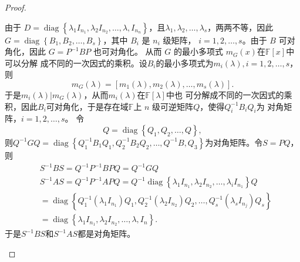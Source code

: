\begin{enumerate}[1~]
\begin{proof}
\begin{subproof}
由于 $D = \operatorname { diag } \left\{ \lambda _ { 1 } I _{ n _ { 1 } } , \lambda _ { 2 } I _ { n _ { 2 } } , \dots , 
\lambda , I _ { n _ { n } } \right\}$，且$\lambda _ { 1 } , 
\lambda _ { 2 } , \dots , \lambda _ { s }$，两两不等，因此
$G = \operatorname { diag } \left\{ B _ { 1 } , B _ { 2 } , 
\dots , B _ { s } \right\}$，其中 $B_i$ 是 $n_i$ 级矩阵，
$i=1, 2, \dots, s$。由于 $B$ 可对角化，因此 $G=P^{-1}BP$ 也可对角化。
从而 $G$ 的最小多项式 $m_G(x)$在$\mathbb{F}[x]$中可以分解
成不同的一次因式的乘积。设$B_i$的最小多项式为$m_i(\lambda), i=1, 2, \dots, s$，则\[
m _ { G } ( \lambda ) = \left[ m _ { 1 } ( \lambda ) , m _ { 2 } ( \lambda ) , \dots , m _ { s } ( \lambda ) \right].
\]
于是$m _ { i } ( \lambda ) \left| m _ { G } ( \lambda )
\right.$，从而$m_i(\lambda)$在$\mathbb{F}[\lambda]$中也
可分解成不同的一次因式的乘积，因此$B_i$可对角化，于是存在域$
\mathbb{F}$上 $n$ 级可逆矩阵$Q$，使得$Q_i^{-1}B_iQ_i$为
对角矩阵，$i=1, 2, \dots, s$。
令\[
 { Q } = \operatorname { diag } \left\{  { Q } _ { 1 } ,  { Q } _ { 2 } , \dots ,  { Q } \right\},
\]
则$Q ^ { - 1 } G Q = \operatorname { diag } \left\{ Q _ { 1 } ^ { - 1 } B _ { 1 } Q _ { 1 } , Q _ { 2 } ^ { - 1 } B _ { 2 } Q _ { 2 } , \dots , Q ^ { - 1 } B , Q _ { 3 } \right\}$为对角矩阵。令$S=PQ$，则\begin{align*}
&S ^ { - 1 } B S = Q ^ { - 1 } P ^ { - 1 } B P Q = Q ^ { - 1 } G Q\\
&S ^ { - 1 } A S = Q ^ { - 1 } P ^ { - 1 } A P Q = Q ^ { - 1 } \operatorname { diag } \left\{ \lambda _ { 1 } I _ { n _ { 1 } } , \lambda _ { 2 } I _ { n _ { 2 } } , \dots , \lambda _ { i } I _ { n _ { 1 } } \right\} Q\\
&= \operatorname { diag } \left\{ Q _ { 1 } ^ { - 1 } \left( \lambda _ { 1 } I _ { n _ { 1 } } \right) Q _ { 1 } , Q _ { 2 } ^ { - 1 } \left( \lambda _ { 2 } I _ { n _ { 2 } } \right) Q _ { 2 } , \dots , Q _ { s } ^ { - 1 } \left( \lambda _ { s } I _ { n _ { j } } \right) Q _ { s } \right\}\\
&= \operatorname { diag } \left\{ \lambda _ { 1 } I _ { n _ { 1 } } , \lambda _ { 2 } I _ { n _ { 2 } } , \dots , \lambda , I _ { n } \right\}.
\end{align*}
于是$S^{-1}BS$和$S^{-1}AS$都是对角矩阵。
\end{subproof}


\end{proof}
\end{enumerate}
